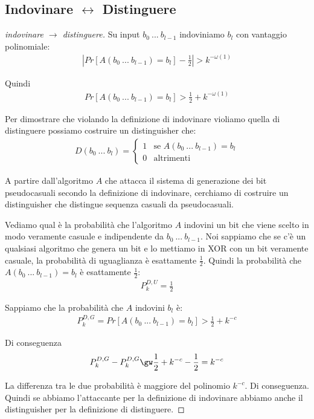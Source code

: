 \subsection{Indovinare $\leftrightarrow$ Distinguere}
\begin{proof}[indovinare $\rightarrow$ distinguere]
    Su input $b_0 \ ... \ b_{l-1}$ indoviniamo $b_l$ con vantaggio polinomiale:
    \begin{align*}
        \left|Pr[A(b_0 \ ... \ b_{l-1}) = b_l] - \frac{1}{2}\right| > k^{-\omega(1)}
    \end{align*}

    \noindent Quindi
    \begin{align*}
        Pr[A(b_0 \ ... \ b_{l-1}) = b_l]   > \frac{1}{2} + k^{-\omega(1)}
    \end{align*}

    \noindent Per dimostrare che violando la definizione di indovinare violiamo quella di distinguere possiamo costruire un distinguisher che:
    \begin{align*}
        D(b_0 \ ... \ b_{l}) = 
        \begin{cases} 
        1 & \mbox{se } A(b_0 \ ... \ b_{l-1}) = b_l \\ 
        0 & \mbox{altrimenti }
        \end{cases} 
    \end{align*}

    \noindent A partire dall'algoritmo $A$ che attacca il sistema di generazione dei bit pseudocasuali secondo la definizione di indovinare, cerchiamo di costruire un distinguisher che distingue sequenza casuali da pseudocasuali.

    Vediamo qual è la probabilità che l'algoritmo $A$ indovini un bit che viene scelto in modo veramente casuale e indipendente da $b_0 \ ... \ b_{l-1}$. Noi sappiamo che se c'è un qualsiasi algoritmo che genera un bit e lo mettiamo in XOR con un bit veramente casuale, la probabilità di uguaglianza è esattamente $\frac{1}{2}$. Quindi la probabilità che $A(b_0 \ ... \ b_{l-1}) = b_l$ è esattamente $\frac{1}{2}$:
    \begin{align}
        P_k^{D, U} = \frac{1}{2}
    \end{align}

    \noindent Sappiamo che la probabilità che $A$  indovini $b_l$ è:
    \begin{align}
        P_k^{D, G} = Pr[A(b_0 \ ... \ b_{l-1}) = b_l] > \frac{1}{2} + k^{-c}
    \end{align}

    \noindent Di conseguenza
    \begin{align}
        P_k^{D, G} - P_k^{D, G} \gw \frac{1}{2} + k^{-c} - \frac{1}{2} = k^{-c}
    \end{align}

    \noindent La differenza tra le due probabilità è maggiore del polinomio $k^{-c }$. Di conseguenza. Quindi se abbiamo l'attaccante per la definizione di indovinare abbiamo anche il distinguisher per la definizione di distinguere. 
\end{proof}

